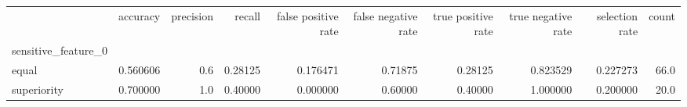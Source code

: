 \begin{tabular}{lrrrrrrrrr}
\toprule
{} &  accuracy &  precision &   recall &  false positive rate &  false negative rate &  true positive rate &  true negative rate &  selection rate &  count \\
sensitive\_feature\_0 &           &            &          &                      &                      &                     &                     &                 &        \\
\midrule
equal               &  0.560606 &        0.6 &  0.28125 &             0.176471 &              0.71875 &             0.28125 &            0.823529 &        0.227273 &   66.0 \\
superiority         &  0.700000 &        1.0 &  0.40000 &             0.000000 &              0.60000 &             0.40000 &            1.000000 &        0.200000 &   20.0 \\
\bottomrule
\end{tabular}
